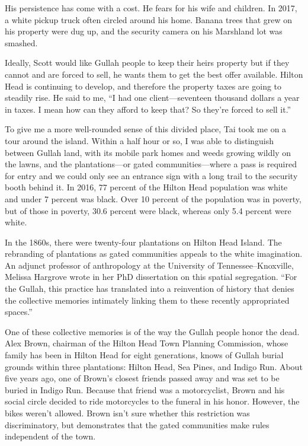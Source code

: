 His persistence has come with a cost. He fears for his wife and
children. In 2017, a white pickup truck often circled around his home.
Banana trees that grew on his property were dug up, and the security
camera on his Marshland lot was smashed.

Ideally, Scott would like Gullah people to keep their heirs property but
if they cannot and are forced to sell, he wants them to get the best
offer available. Hilton Head is continuing to develop, and therefore the
property taxes are going to steadily rise. He said to me, ``I had one
client---seventeen thousand dollars a year in taxes. I mean how can they
afford to keep that? So they're forced to sell it.''

To give me a more well-rounded sense of this divided place, Tai took me
on a tour around the island. Within a half hour or so, I was able to
distinguish between Gullah land, with its mobile park homes and weeds
growing wildly on the lawns, and the plantations---or gated
communities---where a pass is required for entry and we could only see
an entrance sign with a long trail to the security booth behind it. In
2016, 77 percent of the Hilton Head population was white and under 7
percent was black. Over 10 percent of the population was in poverty, but
of those in poverty, 30.6 percent were black, whereas only 5.4 percent
were white.

In the 1860s, there were twenty-four plantations on Hilton Head Island.
The rebranding of plantations as gated communities appeals to the white
imagination. An adjunct professor of anthropology at the University of
Tennessee--Knoxville, Melissa Hargrove wrote in her PhD dissertation on
this spatial segregation. ``For the Gullah, this practice has translated
into a reinvention of history that denies the collective memories
intimately linking them to these recently appropriated spaces.''

One of these collective memories is of the way the Gullah people honor
the dead. Alex Brown, chairman of the Hilton Head Town Planning
Commission, whose family has been in Hilton Head for eight generations,
knows of Gullah burial grounds within three plantations: Hilton Head,
Sea Pines, and Indigo Run. About five years ago, one of Brown's closest
friends passed away and was set to be buried in Indigo Run. Because that
friend was a motorcyclist, Brown and his social circle decided to ride
motorcycles to the funeral in his honor. However, the bikes weren't
allowed. Brown isn't sure whether this restriction was discriminatory,
but demonstrates that the gated communities make rules independent of
the town.

